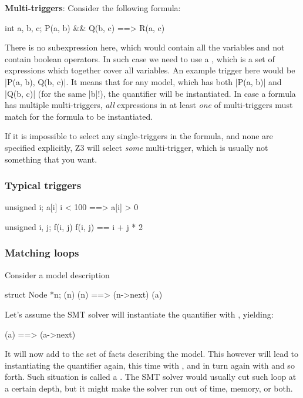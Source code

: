 \begin{note}
\textbf{Multi-triggers}:
Consider the following formula:
\begin{VCC}
\forall int a, b, c; P(a, b) && Q(b, c) ==> R(a, c)
\end{VCC}
There is no subexpression here, which would contain all the variables
and not contain boolean operators.
In such case we need to use a , which
is a set of expressions which together cover all variables.
An example trigger here would be \vcc|{P(a, b), Q(b, c)}|.
It means that for any model, which has both \vcc|P(a, b)|
and \vcc|Q(b, c)| (for the same \vcc|b|!), the quantifier
will be instantiated.
In case a formula has multiple multi-triggers, \emph{all}
expressions in at least \emph{one} of multi-triggers
must match for the formula to be instantiated.

If it is impossible to select any single-triggers in the formula,
and none are specified explicitly, Z3 will select \emph{some}
multi-trigger, which is usually not something that you want.
\end{note}


\subsubsection{Typical triggers}


\begin{VCC}
\forall unsigned i; {a[i]} i < 100 ==> a[i] > 0
\end{VCC}

\begin{VCC}
\forall unsigned i, j; {f(i, j)} f(i, j) == i + j * 2
\end{VCC}

\subsubsection{Matching loops}

Consider a model description
\begin{VCC}
\forall struct Node *n; {\mine(n)} \mine(n) ==> \mine(n->next)
\mine(a)
\end{VCC}
Let's assume the SMT solver will instantiate the quantifier with , yielding:
\begin{VCC}
\mine(a) ==> \mine(a->next)
\end{VCC}
It will now add  to the set of facts
describing the model.
This however will lead to instantiating the quantifier again,
this time with , and in turn again with
 and so forth.
Such situation is called a .
The SMT solver would usually cut such loop at a certain depth,
but it might make the solver run out of time, memory, or both.

